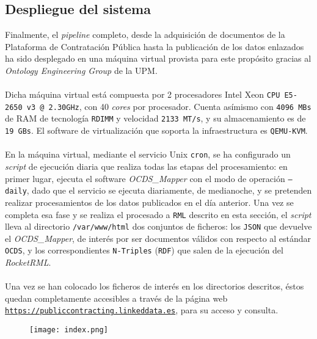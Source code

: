     \subsection{Despliegue del sistema}
        Finalmente, el \textit{pipeline} completo, desde la adquisición de documentos de la Plataforma de Contratación Pública hasta la publicación de los datos enlazados ha sido desplegado en una máquina virtual provista para este propósito gracias al \textit{Ontology Engineering Group} \cite{OEG} de la UPM.
        \\ \\
        Dicha máquina virtual está compuesta por 2 procesadores Intel Xeon \texttt{CPU E5-2650 v3 @ 2.30GHz}, con 40 \textit{cores} por procesador. Cuenta asímismo con \texttt{4096 MBs} de RAM de tecnología \texttt{RDIMM} y velocidad \texttt{2133 MT/s}, y su almacenamiento es de \texttt{19 GBs}. El software de virtualización que soporta la infraestructura es \texttt{QEMU-KVM}.
        \\ \\
        En la máquina virtual, mediante el servicio Unix \texttt{cron}, se ha configurado un \textit{script} de ejecución diaria que realiza todas las etapas del procesamiento: en primer lugar, ejecuta el software \textit{OCDS\_Mapper} con el modo de operación \texttt{--daily}, dado que el servicio se ejecuta diariamente, de medianoche, y se pretenden realizar procesamientos de los datos publicados en el día anterior. Una vez se completa esa fase y se realiza el procesado a \texttt{RML} descrito en esta sección, el \textit{script} lleva al directorio \texttt{/var/www/html} dos conjuntos de ficheros: los \texttt{JSON} que devuelve el \textit{OCDS\_Mapper}, de interés por ser documentos válidos con respecto al estándar \texttt{OCDS}, y los correspondientes \texttt{N-Triples} (\texttt{RDF}) que salen de la ejecución del \textit{RocketRML}.
        \\ \\
        Una vez se han colocado los ficheros de interés en los directorios descritos, éstos quedan completamente accesibles a través de la página web \texttt{\url{https://publiccontracting.linkeddata.es}}, para su acceso y consulta.
        
        \begin{figure}[h]
            \centering
            \texttt{[image: index.png]}
        \end{figure}
        
